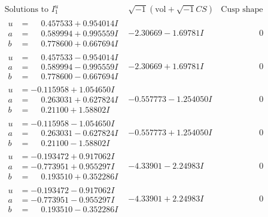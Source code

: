 \documentclass[1p]{elsarticle_modified}
\theoremstyle{definition}
\newcommand{\I}{\sqrt{-1}}
\begin{document}
$$\begin{array}{c|c|c}  
\text{Solutions to }I^u_{1}& \I (\text{vol} + \sqrt{-1}CS) & \text{Cusp shape}\\
 \hline 
\begin{aligned}
u &= \phantom{-}0.457533 + 0.954014 I \\
a &= \phantom{-}0.589994 + 0.995559 I \\
b &= \phantom{-}0.778600 + 0.667694 I\end{aligned}
 & -2.30669 - 1.69781 I & \phantom{-0.000000 } 0 \\ \hline\begin{aligned}
u &= \phantom{-}0.457533 - 0.954014 I \\
a &= \phantom{-}0.589994 - 0.995559 I \\
b &= \phantom{-}0.778600 - 0.667694 I\end{aligned}
 & -2.30669 + 1.69781 I & \phantom{-0.000000 } 0 \\ \hline\begin{aligned}
u &= -0.115958 + 1.054650 I \\
a &= \phantom{-}0.263031 + 0.627824 I \\
b &= \phantom{-}0.21100 + 1.58802 I\end{aligned}
 & -0.557773 - 1.254050 I & \phantom{-0.000000 } 0 \\ \hline\begin{aligned}
u &= -0.115958 - 1.054650 I \\
a &= \phantom{-}0.263031 - 0.627824 I \\
b &= \phantom{-}0.21100 - 1.58802 I\end{aligned}
 & -0.557773 + 1.254050 I & \phantom{-0.000000 } 0 \\ \hline\begin{aligned}
u &= -0.193472 + 0.917062 I \\
a &= -0.773951 + 0.955297 I \\
b &= \phantom{-}0.193510 + 0.352286 I\end{aligned}
 & -4.33901 - 2.24983 I & \phantom{-0.000000 } 0 \\ \hline\begin{aligned}
u &= -0.193472 - 0.917062 I \\
a &= -0.773951 - 0.955297 I \\
b &= \phantom{-}0.193510 - 0.352286 I\end{aligned}
 & -4.33901 + 2.24983 I & \phantom{-0.000000 } 0 \\ \hline\begin{aligned}

\end{aligned}
\end{array}$$
\end{document}
